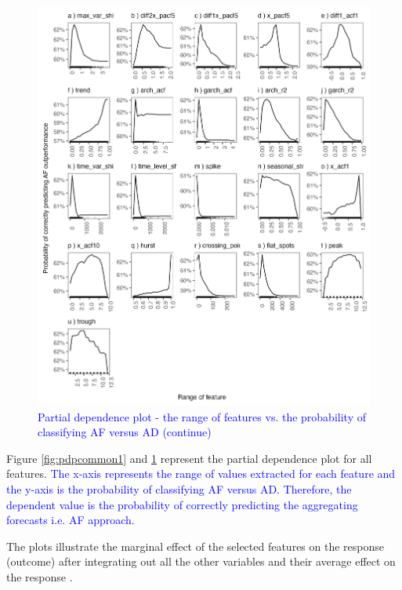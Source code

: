 \documentclass[preprint, 3p,
authoryear]{elsarticle} %
\begin{document}
\begin{figure}[H]

{\centering \includegraphics[width=1\linewidth]{img/partial_dependence2} 

}

\caption{ \textcolor{blue}{Partial dependence plot - the range of features vs. the probability of classifying AF versus AD (continue)} }\label{fig:pdpcommon2}
\end{figure}

Figure \ref{fig:pdpcommon1} and \ref{fig:pdpcommon2} represent the
partial dependence plot for all features.
\textcolor{blue}{The x-axis represents the range of values extracted for each feature and the y-axis is the probability of classifying AF versus AD. Therefore, the dependent value is the probability of correctly predicting the aggregating forecasts i.e. AF approach.}

The plots illustrate the marginal effect of the selected features on the
response (outcome) after integrating out all the other variables and
their average effect on the response \citep{james2013introduction}.
\end{document}

